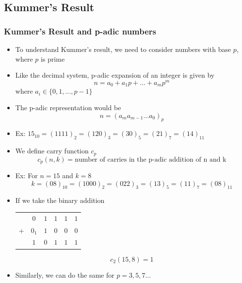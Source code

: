 \documentclass{beamer}
\begin{document}
\subsection{Kummer's Result}
\begin{frame}
    \frametitle{Kummer's Result and p-adic numbers}
    \begin{itemize}
        \item To understand Kummer's result, we need to consider numbers with base $p$, where $p$ is prime 
        \item Like the decimal system, p-adic expansion of an integer is given by
        \begin{equation*}
            n = a_0 + a_1p +\dots + a_m p^m
        \end{equation*}
        where $a_i \in \{0,1,\dots,p-1\}$
        \item The p-adic representation would be 
        \begin{equation*}
            n = (a_m a_{m-1} \dots a_0)_p
        \end{equation*} 
        \item Ex: $15_{10} = (1111)_2 = (120)_3 = (30)_5 = (21)_7 = (14)_{11}$ 
    \end{itemize}
    
\end{frame}

\begin{frame}
    \begin{itemize}
        \item We define carry function $c_p$
        \begin{equation*}
            c_p(n,k) = \text{number of carries in the p-adic addition of n and k}
        \end{equation*}
        \item Ex: For $n = 15$ and $k=8$
        \begin{equation*}
            k=(08)_{10}=(1000)_{2}=(022)_{3}=(13)_{5}=(11)_{7}=(08)_{11}
        \end{equation*}
        \item If we take the binary addition
        \begin{tabular}{cccccc}
            & $0$ & $1$ & $1$ & $1$ & $1$ \\
            + & $0_1$ & $1$ & $0$ & $0$ & $0$ \\
            \hline
            & $1$ & $0$ & $1$ & $1$ & $1$ 
        \end{tabular}
        \begin{equation*}
            c_2(15,8) = 1
        \end{equation*}
        \item Similarly, we can do the same for $p=3,5,7\dots$
    \end{itemize}
\end{frame}
\end{document}
